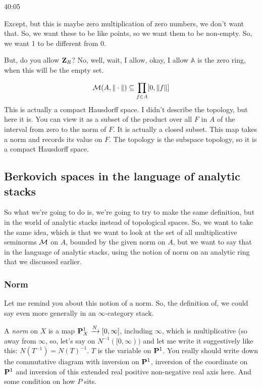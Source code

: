 \begin{example}
\begin{unfinished}{40:05}
\begin{example}
Except, but this is maybe zero multiplication of zero numbers, we don't want that. So, we want these to be like points, so we want them to be non-empty. So, we want 1 to be different from 0.

But, do you allow $\Z_R$? No, well, wait, I allow, okay, I allow $\mathbb{A}$ is the zero ring, when this will be the empty set.
\end{example}

\begin{align}
\BerkSpec(A, \norm{\cdot}) \subseteq \prod_{f \in A} [0, \norm{f} ]
\end{align}
This is actually a compact Hausdorff space. I didn't describe the topology, but here it is. You can view it as a subset of the product over all $F$ in $A$ of the interval from zero to the norm of $F$. It is actually a closed subset. This map takes a norm and records its value on $F$. The topology is the subspace topology, so it is a compact Hausdorff space.

\subsection{Berkovich spaces in the language of analytic stacks} \label{subsec:berk_spaces_language_analytic_stacks}
So what we're going to do is, we're going to try to make the same definition, but in the world of analytic stacks instead of topological spaces. So, we want to take the same idea, which is that we want to look at the set of all multiplicative seminorms $\BerkSpec$ on $A$, bounded by the given norm on $A$, but we want to say that in the language of analytic stacks, using the notion of norm on an analytic ring that we discussed earlier.

\subsubsection{Norm} \label{subsubsec:norm_reminder}
Let me remind you about this notion of a norm. So, the definition of, we could say even more generally in an $\infty$-category stack. 


A \emph{norm} on $X$ is a map $\P^1_X \xrightarrow{N} [0, \infty]$, including $\infty$, which is multiplicative (so away from $\infty$, so, let's say on $N^{-1} ([0, \infty))$ and let me write it suggestively like this: $N(T^{-1}) = N(T)^{-1}$. $T$ is the variable on $\P^1$. You really should write down the commutative diagram with inversion on $\P^1$, inversion of the coordinate on $\P^1$ and inversion of this extended real positive non-negative real axis here. 
And some condition on how $P$ sits.


\end{unfinished}
\end{example}
